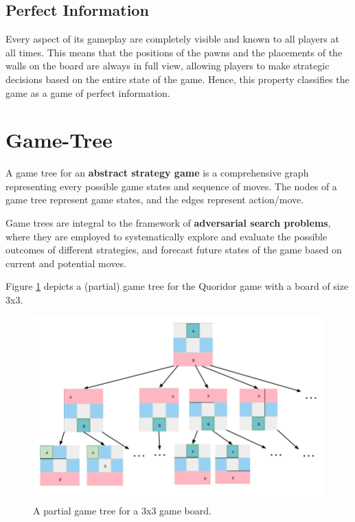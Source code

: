 \subsection{Perfect Information}
Every aspect of its gameplay are completely visible and known to all players at all times. This means that the positions of the pawns and the placements of the walls on the board are always in full view, allowing players to make strategic decisions based on the entire state of the game. Hence, this property classifies the game as a game of perfect information.

\section{Game-Tree}

A game tree for an \textbf{abstract strategy game} is a comprehensive graph representing every possible game states and sequence of moves. The nodes of a game tree represent game states, and the
edges represent action/move.

Game trees are integral to the framework of \textbf{adversarial search problems}, where they are employed to systematically explore and evaluate the possible outcomes of different strategies, and forecast future states of the game based on current and potential moves.

Figure \ref{fig:GameTree} depicts a (partial) game tree for the Quoridor game with a board of size 3x3.

\begin{figure}[!ht]
    \centering
    \includegraphics[scale=0.45]{../img/GameBoard/game_tree.png}
    \caption{A partial game tree for a 3x3 game board.}
    \label{fig:GameTree}
\end{figure}

